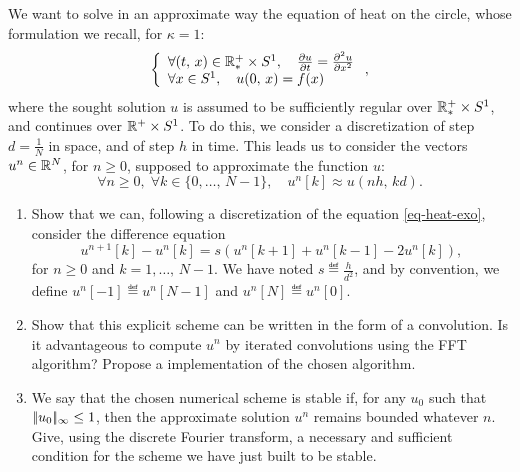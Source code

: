  
\begin{exo}
\label{exo-resol-eq-heat-diff-finies}
 
  We want to solve in an approximate way the equation of heat on the circle, whose formulation we recall, for $ \kappa = 1 $:
\begin{equation}
\label{eq-heat-exo}
\left\{\begin{array}{l} \forall (t, \, x) \in \mathbb{R}_*^{+} \times S^1, \quad \frac{ \partial u}{\partial t} = \frac{ \partial^2 u}{\partial x^2} \\\forall x \in S^1, \quad u (0, \, x) = f(x) \end{array} \right. ,
\end{equation}
where the sought solution $ u $ is assumed to be sufficiently regular over $ \mathbb{R}_*^{+} \times S^1 $, and continues over $ \mathbb{R}^{+} \times S^1 $. To do this, we consider a discretization of step $ d = \frac{1}{N} $ in space, and of step $ h $ in time. This leads us to consider the vectors $ u^n \in \mathbb{R}^N $, for $ n \geq 0 $, supposed to approximate the function $ u $:
\begin{equation*}
\forall n \geq 0, \; \forall k \in \{0, \ldots, \, N-1 \}, \quad u^n [k] \approx u (nh, \, kd).
\end{equation*}
\begin{enumerate}
\item Show that we can, following a discretization of the equation \eqref{eq-heat-exo}, consider the difference equation
\begin{equation*}
u^{n + 1}[k] - u^n [k] = s \left(u^n [k + 1] + u^n [k-1] - 2 u^n [k] \right) ,
\end{equation*}
for $ n \geq 0 $ and $ k = 1, \ldots, \, N-1 $. We have noted $ s \eqdef \frac{h}{d^2} $, and by convention, we define $ u^n [-1] \eqdef u^n [N-1] $ and $ u^n [ N] \eqdef u^n [0] $.
\item {} Show that this explicit scheme can be written in the form of a convolution. Is it advantageous to compute $ u^n $ by iterated convolutions using the FFT algorithm? Propose a \Matlab{} implementation of the chosen algorithm.
\item We say that the chosen numerical scheme is stable if, for any $ u_0 $ such that $ |\!| u_0 |\!|_{\infty} \leq 1 $, then the approximate solution $ u^n $ remains bounded whatever $ n $. Give, using the discrete Fourier transform, a necessary and sufficient condition for the scheme we have just built to be stable.

\end{enumerate}
\end{exo}
